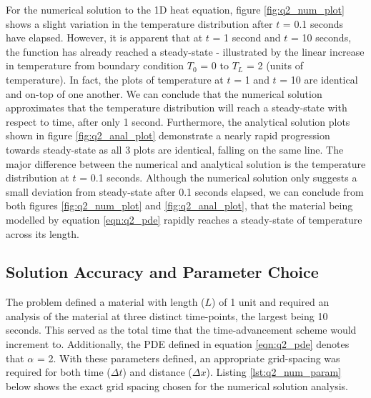 \documentclass[12pt]{article}
\begin{document}
For the numerical solution to the 1D heat equation, figure \ref{fig:q2_num_plot} shows a slight variation in the temperature distribution after $t$ = 0.1 seconds have elapsed. However, it is apparent that at $t$ = 1 second and $t$ = 10 seconds, the function has already reached a steady-state - illustrated by the linear increase in temperature from boundary condition $T_0$ = 0 to $T_L$ = 2 (units of temperature). In fact, the plots of temperature at $t$ = 1 and $t$ = 10 are identical and on-top of one another. We can conclude that the numerical solution approximates that the temperature distribution will reach a steady-state with respect to time, after only 1 second. Furthermore, the analytical solution plots shown in figure \ref{fig:q2_anal_plot} demonstrate a nearly rapid progression towards steady-state as all 3 plots are identical, falling on the same line. The major difference between the numerical and analytical solution is the temperature distribution at $t$ = 0.1 seconds. Although the numerical solution only suggests a small deviation from steady-state after 0.1 seconds elapsed, we can conclude from both figures \ref{fig:q2_num_plot} and \ref{fig:q2_anal_plot}, that the material being modelled by equation \ref{eqn:q2_pde} rapidly reaches a steady-state of temperature across its length.

\subsection{Solution Accuracy and Parameter Choice}

The problem defined a material with length ($L$) of 1 unit and required an analysis of the material at three distinct time-points, the largest being 10 seconds. This served as the total time that the time-advancement scheme would increment to. Additionally, the PDE defined in equation \ref{eqn:q2_pde} denotes that $\alpha$ = 2. With these parameters defined, an appropriate grid-spacing was required for both time ($\Delta t$) and distance ($\Delta x$). Listing \ref{lst:q2_num_param} below shows the exact grid spacing chosen for the numerical solution analysis.


\end{document}
